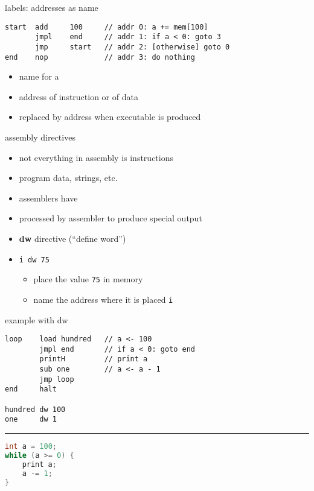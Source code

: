 \begin{frame}[fragile,label=addrAsName2]{labels: addresses as name}
\begin{lstlisting}[language=myasm]
start  add     100     // addr 0: a += mem[100]
       jmpl    end     // addr 1: if a < 0: goto 3
       jmp     start   // addr 2: [otherwise] goto 0
end    nop             // addr 3: do nothing
\end{lstlisting}
    \begin{itemize}
    \item name for a 
    \item address of instruction or of data
    \item replaced by address when executable is produced
    \end{itemize}
\end{frame}


\begin{frame}{assembly directives}
    \begin{itemize}
    \item not everything in assembly is instructions
    \item program data, strings, etc.
    \item assemblers have 
    \item processed by assembler to produce special output
    \vspace{.5cm}
    \item<2-> \textbf{dw} directive (``define word'')
    \item<3-> \texttt{i dw 75}
        \begin{itemize}
            \item place the value \texttt{75} in memory
            \item name the address where it is placed \texttt{i}
        \end{itemize}
    \end{itemize}
\end{frame}

\begin{frame}[fragile,label=dwExample]{example with dw}
\begin{lstlisting}[language=myasm,style=small]
loop    load hundred   // a <- 100
        jmpl end       // if a < 0: goto end
        printH         // print a
        sub one        // a <- a - 1
        jmp loop
end     halt

hundred dw 100
one     dw 1
\end{lstlisting}
\hrule
\begin{lstlisting}[language=C++,style=small]
int a = 100;
while (a >= 0) {
    print a;
    a -= 1;
}
\end{lstlisting}
\end{frame}

